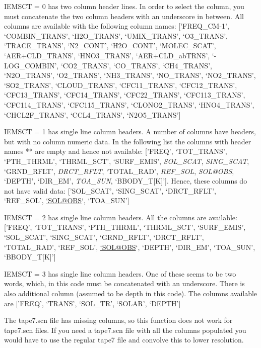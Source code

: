 \documentclass[a4paper,10pt,english]{sphinxmanual}
\begin{document}
\begin{fulllineitems}
IEMSCT = 0 has two column header lines.  In order to select the column, you
must concatenate the two column headers with an underscore in between. All
columns are available with the following column names: {[}'FREQ\_CM-1',
`COMBIN\_TRANS', `H2O\_TRANS', `UMIX\_TRANS', `O3\_TRANS', `TRACE\_TRANS',
`N2\_CONT', `H2O\_CONT', `MOLEC\_SCAT', `AER+CLD\_TRANS', `HNO3\_TRANS',
`AER+CLD\_abTRNS', `-LOG\_COMBIN', `CO2\_TRANS', `CO\_TRANS', `CH4\_TRANS',
`N2O\_TRANS', `O2\_TRANS', `NH3\_TRANS', `NO\_TRANS', `NO2\_TRANS',
`SO2\_TRANS', `CLOUD\_TRANS', `CFC11\_TRANS', `CFC12\_TRANS', `CFC13\_TRANS',
`CFC14\_TRANS', `CFC22\_TRANS', `CFC113\_TRANS', `CFC114\_TRANS',
`CFC115\_TRANS', `CLONO2\_TRANS', `HNO4\_TRANS', `CHCL2F\_TRANS',
`CCL4\_TRANS', `N2O5\_TRANS'{]}

IEMSCT = 1 has single line column headers. A number of columns have
headers, but with no column numeric data.  In the following list the
columns with header names ** are empty and hence not available: {[}'FREQ',
`TOT\_TRANS', `PTH\_THRML', `THRML\_SCT', `SURF\_EMIS', \emph{SOL\_SCAT},
\emph{SING\_SCAT}, `GRND\_RFLT', \emph{DRCT\_RFLT}, `TOTAL\_RAD', \emph{REF\_SOL}, \emph{SOL@OBS},
`DEPTH', `DIR\_EM', \emph{TOA\_SUN}, `BBODY\_T{[}K{]}'{]}. Hence, these columns do not
have valid data: {[}'SOL\_SCAT', `SING\_SCAT', `DRCT\_RFLT', `REF\_SOL',
\href{mailto:'SOL@OBS}{`SOL@OBS}`, `TOA\_SUN'{]}

IEMSCT = 2 has single line column headers. All the columns are available:
{[}'FREQ', `TOT\_TRANS', `PTH\_THRML', `THRML\_SCT', `SURF\_EMIS', `SOL\_SCAT',
`SING\_SCAT', `GRND\_RFLT', `DRCT\_RFLT', `TOTAL\_RAD', `REF\_SOL', \href{mailto:'SOL@OBS}{`SOL@OBS}`,
`DEPTH', `DIR\_EM', `TOA\_SUN', `BBODY\_T{[}K{]}'{]}

IEMSCT = 3 has single line column headers.  One of these seems to be two
words, which, in this code must be concatenated with an underscore. There
is also  additional column (assumed to be depth in this code).  The
columns available are {[}'FREQ', `TRANS', `SOL\_TR', `SOLAR', `DEPTH'{]}

The tape7.scn file has missing columns, so this function does not work for
tape7.scn files.  If you need a tape7.scn file with all the columns populated
you would have to use the regular tape7 file and convolve this to lower resolution.

\end{fulllineitems}

\end{document}
